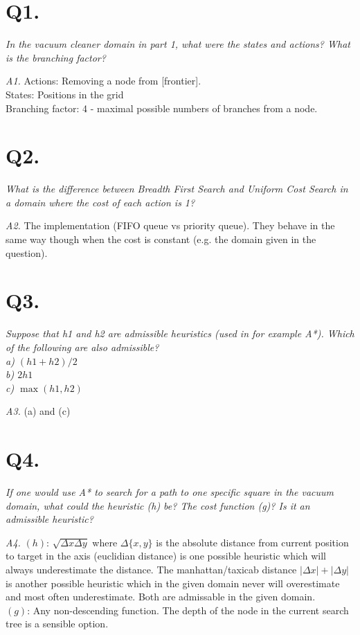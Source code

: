 \section{Q1.}
\em In the vacuum cleaner domain in part 1, what were the states and actions? What is the branching factor?\em

\emph{A1.} Actions: Removing a node from [frontier].\\
    States: Positions in the grid\\
    Branching factor: 4 - maximal possible numbers of branches from a node.\\

\section{Q2.}
\em What is the difference between Breadth First Search and Uniform Cost Search in a domain where the cost
    of each action is 1?\em

\emph{A2.} The implementation (FIFO queue vs priority queue). They behave in the same way though when the cost
    is constant (e.g. the domain given in the question).

\section{Q3.}
\em Suppose that h1 and h2 are admissible heuristics (used in for example A*). Which of the following are
    also admissible?\\
    a) $(h1+h2)/2$\\
    b) $2h1$\\
    c) $\max(h1,h2)$\em

\emph{A3.} (a) and (c)

\section{Q4.}
\em If one would use A* to search for a path to one specific square in the vacuum domain, what could the
    heuristic (h) be? The cost function (g)? Is it an admissible heuristic?\em

\emph{A4.}
    $(h)$: $\sqrt{\Delta{}x\Delta{}y}$ where $\Delta{}\{x,y\}$ is the absolute distance from current
    position to target in the axis (euclidian distance) is one possible heuristic which will always
    underestimate the distance. The manhattan/taxicab distance $|\Delta x| + |\Delta y|$ is another
    possible heuristic which in the given domain never will overestimate and most often underestimate.
    Both are admissable in the given domain.\\
    $(g)$: Any non-descending function. The depth of the node in the current search tree is a sensible option.

